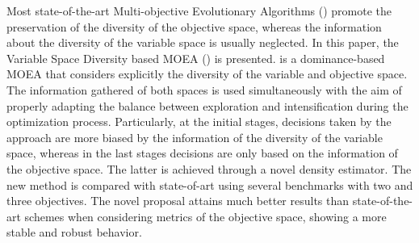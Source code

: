 Most state-of-the-art Multi-objective Evolutionary Algorithms (\MOEAS{}) promote the preservation of the diversity 
of the objective space, whereas the information about the diversity of the variable space is usually neglected.
%
In this paper, the Variable Space Diversity based MOEA (\VSDMOEA{}) is presented.
%
\VSDMOEA{} is a dominance-based MOEA that considers explicitly the diversity of the variable and objective space.
%
The information gathered of both spaces is used simultaneously with the aim of properly adapting the balance between exploration
and intensification during the optimization process.
%
Particularly, at the initial stages, decisions taken by the approach are more biased by the information of the diversity of 
the variable space, whereas in the last stages decisions are only based on the information of the objective space.
%
The latter is achieved through a novel density estimator.
%
The new method is compared with state-of-art \MOEAS{} using several benchmarks with two and three objectives.
%
The novel proposal attains much better results than state-of-the-art schemes when considering metrics of the objective space, 
showing a more stable and robust behavior.
